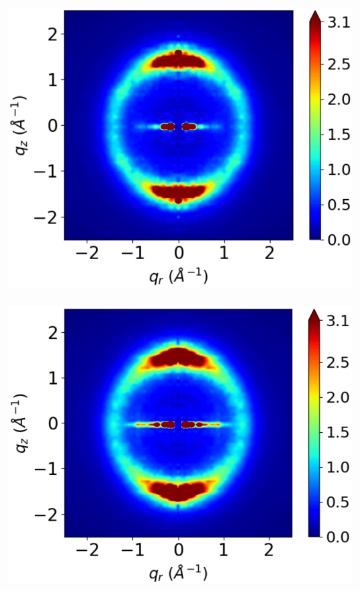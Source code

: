 \documentclass[journal=jpcbfk,manuscript=article]{achemso}
\begin{document}
\begin{figure}[!htb]
  \begin{subfigure}{0.3\linewidth}
  	\centering
  	\includegraphics[width=\textwidth]{rotated_monomers_rzplot_norestraints.pdf}
  	\caption{}\label{fig:rotated_monomers_rzplot_norestraints}
  \end{subfigure}
  \begin{subfigure}{0.3\linewidth}
  	\centering
  	\includegraphics[width=\textwidth]{staggered_rzplot_norestraints.pdf}

\end{subfigure}
\end{figure}
\end{document}
